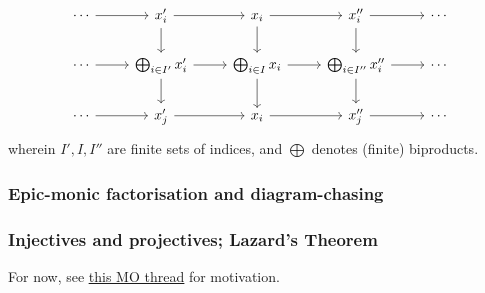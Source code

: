 \begin{example}
                            $$
                                \begin{tikzcd}
                                	\cdots & {x'_i} & {x_i} & {x''_i} & \cdots \\
                                	{\cdots} & {\bigoplus_{i \in I'} x_i'} & {\bigoplus_{i \in I} x_i} & {\bigoplus_{i \in I''} x_i''} & {\cdots} \\
                                	\cdots & {x_j'} & {x_i} & {x_j''} & \cdots
                                	\arrow[from=2-1, to=2-2]
                                	\arrow[from=2-2, to=2-3]
                                	\arrow[from=2-3, to=2-4]
                                	\arrow[from=2-4, to=2-5]
                                	\arrow[from=1-2, to=2-2]
                                	\arrow[from=2-2, to=3-2]
                                	\arrow[from=1-3, to=2-3]
                                	\arrow[from=2-3, to=3-3]
                                	\arrow[from=1-4, to=2-4]
                                	\arrow[from=2-4, to=3-4]
                                	\arrow[from=1-2, to=1-3]
                                	\arrow[from=1-3, to=1-4]
                                	\arrow[from=3-2, to=3-3]
                                	\arrow[from=3-3, to=3-4]
                                	\arrow[from=1-1, to=1-2]
                                	\arrow[from=1-4, to=1-5]
                                	\arrow[from=3-1, to=3-2]
                                	\arrow[from=3-4, to=3-5]
                                \end{tikzcd}
                            $$
                        wherein $I', I, I''$ are finite sets of indices, and $\bigoplus$ denotes (finite) biproducts.
                    \end{example}
            
            \subsubsection{Epic-monic factorisation and diagram-chasing}
            
            \subsubsection{Injectives and projectives; Lazard's Theorem}
                For now, see \href{https://mathoverflow.net/questions/46541/how-to-introduce-notions-of-flat-projective-and-free-modules}{\underline{this MO thread}} for motivation.
            
